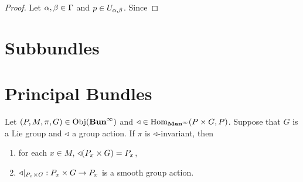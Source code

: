 \documentclass{book}
\begin{document}
	\begin{proof}
		Let $\alpha, \beta \in \Gamma$ and $p \in U_{\alpha, \beta}$. Since 
	\end{proof}

	
	
	









	
	
	
	
	
	
	
	
	
	
	
	

	
	
	
	
	
	
	
	
	
	
	
	
	
	
	
	
	
	
	
	
	
	
	
	
	
	
	
	
	
	\newpage
	\section{Subbundles}
	
	\begin{defn}
		
	\end{defn}
	
	
	
	
	\newpage
	\section{Principal Bundles}
	
	\begin{note}
	\end{note}
	
	\begin{ex}
		Let $(P, M, \pi, G) \in \operatorname{Obj}(\operatorname*{\text{\textbf{Bun}}^{\infty}})$ and $\triangleleft \in \operatorname{Hom}_{\operatorname*{\text{\textbf{Man}}^{\infty}}}(P \times G, P)$. Suppose that $G$ is a Lie group and $\triangleleft$ a group action. If $\pi$ is $\triangleleft$-invariant, then 
		\begin{enumerate}
			\item for each $x \in M$, $\triangleleft(P_x \times G) = P_x$,
			\item $\triangleleft|_{P_x \times G}: P_x \times G \rightarrow P_x$ is a smooth group action.
		\end{enumerate}
	\end{ex}
\end{document}
